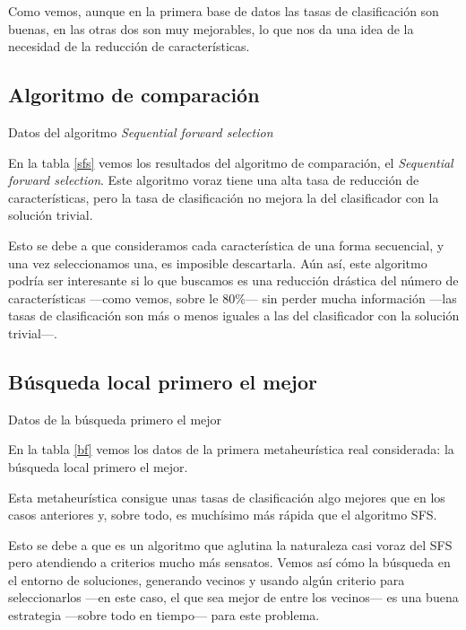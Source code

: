 \documentclass[a4paper, 11pt, titlepage]{article}
\begin{document}
    Como vemos, aunque en la primera base de datos las tasas de clasificación son buenas, en las otras dos son muy mejorables, lo que nos da una idea de la necesidad de la reducción de características.

    \subsection{Algoritmo de comparación}
    \begin{table}[!htb]
        \maketable{\dataSFS}
        \caption{Datos del algoritmo \emph{Sequential forward selection}}
        \label{sfs}
    \end{table}

    En la tabla \ref{sfs} vemos los resultados del algoritmo de comparación, el \emph{Sequential forward selection}. Este algoritmo voraz tiene una alta tasa de reducción de características, pero la tasa de clasificación no mejora la del clasificador con la solución trivial.

    Esto se debe a que consideramos cada característica de una forma secuencial, y una vez seleccionamos una, es imposible descartarla. Aún así, este algoritmo podría ser interesante si lo que buscamos es una reducción drástica del número de características ---como vemos, sobre le 80\%--- sin perder mucha información ---las tasas de clasificación son más o menos iguales a las del clasificador con la solución trivial---.

    \subsection{Búsqueda local primero el mejor}
    \begin{table}[!htb]
        \maketable{\dataBF}
        \caption{Datos de la búsqueda primero el mejor}
        \label{bf}
    \end{table}

    En la tabla \ref{bf} vemos los datos de la primera metaheurística real considerada: la búsqueda local primero el mejor.

    Esta metaheurística consigue unas tasas de clasificación algo mejores que en los casos anteriores y, sobre todo, es muchísimo más rápida que el algoritmo SFS.

    Esto se debe a que es un algoritmo que aglutina la naturaleza casi voraz del SFS pero atendiendo a criterios mucho más sensatos. Vemos así cómo la búsqueda en el entorno de soluciones, generando vecinos y usando algún criterio para seleccionarlos ---en este caso, el que sea mejor de entre los vecinos--- es una buena estrategia ---sobre todo en tiempo--- para este problema.
\end{document}
